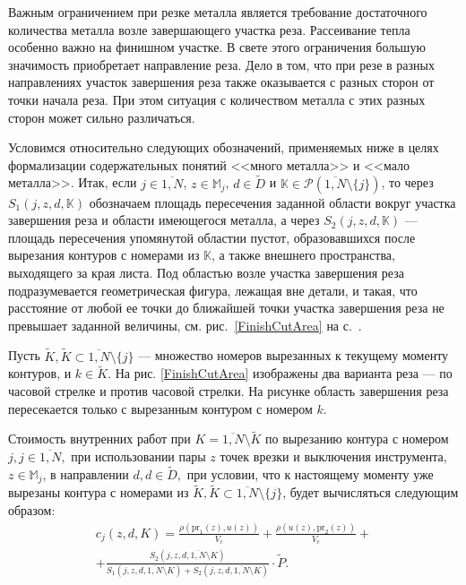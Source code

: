 Важным ограничением при резке металла является требование достаточного
количества металла возле завершающего участка реза.
Рассеивание тепла особенно важно на финишном участке.
В свете этого ограничения большую значимость приобретает направление реза.
Дело в том,
что при резе в разных направлениях участок завершения реза
также оказывается с разных сторон от точки начала реза.
При этом ситуация с количеством металла
с этих разных сторон может сильно различаться.

Условимся относительно следующих обозначений,
применяемых ниже в целях формализации
содержательных понятий <<много металла>> и <<мало металла>>.
Итак, если
$j\in \overline{1,N}$,
$z\in \mathbb{M}_j$,
$d\in \tilde{D}$ и
$\mathbb{K}\in \mathcal{P}(\overline{1,N}\setminus \{j\})$,
то через
$S_1(j,z,d,\mathbb{K})$ обозначаем площадь пересечения заданной
области вокруг участка завершения реза и области имеющегося металла,
а через
$S_2(j,z,d,\mathbb{K})$ --- площадь пересечения упомянутой областии пустот,
образовавшихся после вырезания контуров с номерами из $\mathbb{K}$,
а также внешнего пространства, выходящего за края листа.
Под областью возле участка завершения реза подразумевается геометрическая фигура,
лежащая вне детали, и такая,
что расстояние от любой ее точки до ближайшей точки участка
завершения реза не превышает заданной величины,
см. рис.~\ref{FinishCutArea}
на с.~\pageref{FinishCutArea}.

Пусть
$\tilde{K}, \tilde{K}\subset \overline{1,N}\setminus \{j\}$
--- множество номеров вырезанных к текущему моменту контуров,
и $k\in \tilde{K}$.
На рис. \ref{FinishCutArea}
изображены два варианта реза ---
по часовой стрелке и против часовой стрелки.
На рисунке область завершения реза пересекается только с вырезанным
контуром с номером $k$.

Стоимость внутренних работ
при $K=\overline{1,N}\setminus \tilde{K}$
по вырезанию контура с номером $j,j\in \overline{1,N},$
при использовании пары $z$ точек врезки и выключения инструмента,
$z\in \mathbb{M}_j$,
в направлении $d,d\in \tilde{D},$ при условии,
что к настоящему моменту уже вырезаны контура с номерами из
$\tilde{K},\tilde{K}\subset \overline{1,N}\setminus \{j\}$,
будет вычисляться следующим образом:
\begin{equation}\label{IntPrice}
  \begin{array}{c}
  c_j(z,d,K)=\frac{\rho(\mbox{pr}_1(z),u(z))}{V_c}+
  \frac{\rho(u(z),\mbox{pr}_2(z))}{V_c}+\\
  +\frac{S_2(j,z,d,\overline{1,N}\setminus K)}{S_1(j,z,d,\overline{1,N}\setminus K)+
  S_2(j,z,d,\overline{1,N}\setminus K)}\cdot\tilde{P}
  .
  \end{array}
\end{equation}

